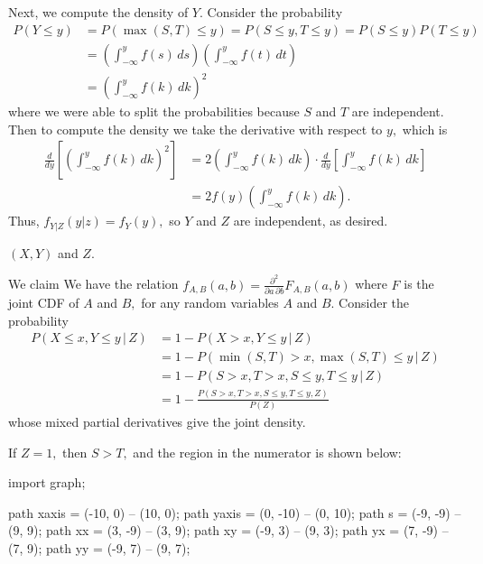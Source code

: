 \documentclass{article}
\begin{document}
\begin{enumerate}
\begin{enumerate}
\begin{enumerate}
\begin{soln}
				Next, we compute the density of $Y.$ Consider the probability 
			\begin{align*}
				P(Y\le y)&=P(\max{(S, T)}\le y) = P(S\le y, T\le y)=P(S\le y)P(T\le y) \\
				&=\left(\int_{-\infty}^y f(s)\, ds\right)\left( \int_{-\infty}^y f(t)\, dt \right) \\
				&= \left( \int_{-\infty}^y f(k)\, dk \right)^2
			\end{align*} where we were able to split the probabilities because $S$ and $T$ are independent. Then to compute the density we take the derivative with respect to $y,$ which is 
			\begin{align*}
				\frac{d}{dy}\left[ \left( \int_{-\infty}^y f(k)\, dk \right)^2 \right] &= 2\left( \int_{-\infty}^y f(k)\, dk \right)\cdot\frac{d}{dy}\left[ \int_{-\infty}^y f(k)\, dk \right] \\
				&= 2f(y)\left( \int_{-\infty}^y f(k)\, dk \right).
			\end{align*}
			Thus, $f_{Y|Z}(y|z)=f_Y(y),$ so $Y$ and $Z$ are independent, as desired.
		
		\end{soln}

		\ii $(X, Y)$ and $Z.$

		\begin{soln}
			We claim  We have the relation $f_{A, B}(a, b)=\frac{\partial^2}{\partial a\, \partial b}F_{A, B}(a, b)$ where $F$ is the joint CDF of $A$ and $B,$ for any random variables $A$ and $B.$ Consider the probability 
		\begin{align*}
			P(X\le x, Y\le y\, \vert\, Z) &= 1-P(X>x, Y\le y\, \vert\, Z) \\
			&= 1-P(\min{(S, T)}>x, \max{(S, T)}\le y\, \vert\, Z) \\
			&= 1-P(S>x, T>x, S\le y, T\le y\, \vert\, Z) \\
			&= 1-\frac{P(S>x, T>x, S\le y, T\le y, Z)}{P(Z)}
		\end{align*} whose mixed partial derivatives give the joint density.

		If $Z=1,$ then $S>T,$ and the region in the numerator is shown below:

				\begin{center}
					\begin{asy}
						import graph;

						path xaxis = (-10, 0) -- (10, 0);
						path yaxis = (0, -10) -- (0, 10);
						path s = (-9, -9) -- (9, 9);
						path xx = (3, -9) -- (3, 9);
						path xy = (-9, 3) -- (9, 3);
						path yx = (7, -9) -- (7, 9);
						path yy = (-9, 7) -- (9, 7);


\end{asy}
\end{center}
\end{soln}
\end{enumerate}
\end{enumerate}
\end{enumerate}
\end{document}
